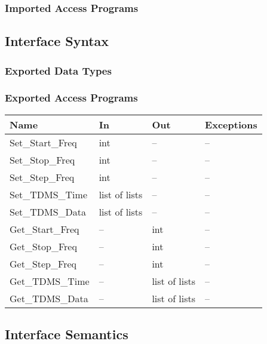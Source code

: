 \documentclass[12pt]{article}
\begin{document}
\subsubsection{Imported Access Programs}

\subsection{Interface Syntax}
\subsubsection{Exported Data Types}


\subsubsection{Exported Access Programs}
\begin{center}
\begin{tabular}{l l l l}
\hline
\textbf{Name} & \textbf{In} & \textbf{Out} & \textbf{Exceptions} \\ \hline
Set\_Start\_Freq & int & -- & --\\
Set\_Stop\_Freq & int & -- & --\\
Set\_Step\_Freq & int & -- & --\\
Set\_TDMS\_Time & list of lists & -- & --\\
Set\_TDMS\_Data & list of lists & -- & --\\

Get\_Start\_Freq & -- & int & --\\
Get\_Stop\_Freq & -- & int & --\\
Get\_Step\_Freq & -- & int & --\\
Get\_TDMS\_Time & -- & list of lists & --\\
Get\_TDMS\_Data & -- & list of lists & --\\
\hline
\end{tabular}
\end{center}
\subsection{Interface Semantics}
\end{document}
